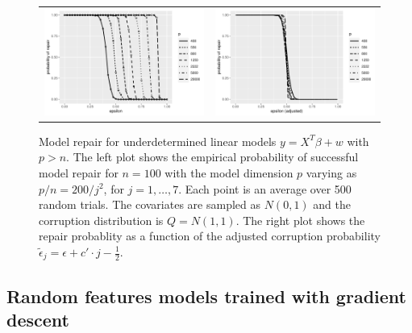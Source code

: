 \begin{figure}[t]
  \begin{center}
    \begin{tabular}{cc}
      \includegraphics[width=.47\textwidth]{fig/plot-linear-100} &
      \includegraphics[width=.47\textwidth]{fig/plot-linear-100-adj}\\[-10pt]
    \end{tabular}
  \end{center}
\caption{Model repair for underdetermined linear models $y=X^T\beta + w$ with $p>n$. The left plot shows the empirical probability of successful model repair for $n=100$ with the model dimension $p$
varying as $p/n = 200 /j^2$, for $j=1,\ldots, 7$. Each point is an average over 500 random trials. The covariates are sampled as $N(0,1)$ and the corruption distribution is $Q=N(1,1)$. The right plot shows the repair probablity as a function
of the adjusted corruption probability $\tilde\epsilon_j = \epsilon + c'\cdot j - \frac{1}{2}$.}
\label{fig:exp1}
\end{figure}


\subsection{Random features models trained with gradient descent}

